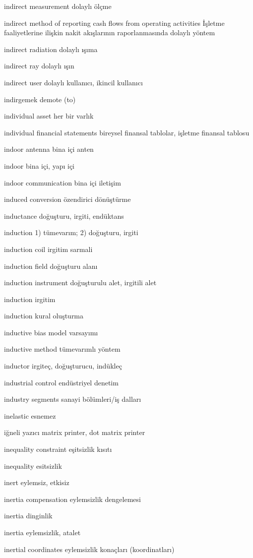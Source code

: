 \documentclass[12pt,fleqn]{article}\usepackage{../../common}
\begin{document}
indirect measurement dolaylı ölçme

indirect method of reporting cash flows from operating activities İşletme faaliyetlerine ilişkin nakit akışlarının raporlanmasında dolaylı yöntem

indirect radiation dolaylı ışıma

indirect ray dolaylı ışın

indirect user dolaylı kullanıcı, ikincil kullanıcı

indirgemek demote (to)

individual asset her bir varlık

individual financial statements bireysel finansal tablolar, işletme finansal tablosu

indoor antenna bina içi anten

indoor bina içi, yapı içi

indoor communication bina içi iletişim

induced conversion özendirici dönüştürme

inductance doğuşturu, irgiti, endüktans

induction 1) tümevarım; 2) doğuşturu, irgiti

induction coil irgitim sarmali

induction field doğuşturu alanı

induction instrument doğuşturulu alet, irgitili alet

induction irgitim

induction kural oluşturma

inductive bias model varsayımı

inductive method tümevarımlı yöntem

inductor irgiteç, doğuşturucu, indükleç

industrial control endüstriyel denetim

industry segments sanayi bölümleri/iş dalları

inelastic esnemez

iğneli yazıcı matrix printer, dot matrix printer

inequality constraint eşitsizlik kısıtı

inequality esitsizlik

inert eylemsiz, etkisiz

inertia compensation eylemsizlik dengelemesi

inertia dinginlik

inertia eylemsizlik, atalet

inertial coordinates eylemsizlik konaçları (koordinatları)
\end{document}

